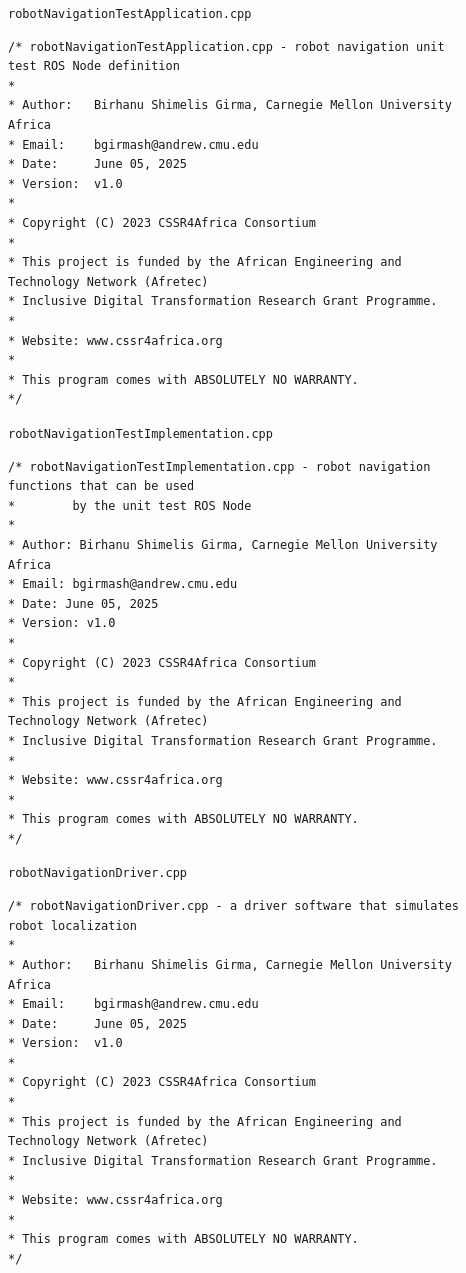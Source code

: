 \documentclass{CSSRforAfrica}
\newcommand{\checkboxChecked}{\fbox{\ding{51}}} %
\begin{document}
\begin{description}

\item[\checkboxChecked] {\small \verb+robotNavigationTestApplication.cpp+}
{\scriptsize \begin{verbatim}
/* robotNavigationTestApplication.cpp - robot navigation unit test ROS Node definition
*
* Author:   Birhanu Shimelis Girma, Carnegie Mellon University Africa
* Email:    bgirmash@andrew.cmu.edu
* Date:     June 05, 2025
* Version:  v1.0
*
* Copyright (C) 2023 CSSR4Africa Consortium
*
* This project is funded by the African Engineering and Technology Network (Afretec)
* Inclusive Digital Transformation Research Grant Programme.
*
* Website: www.cssr4africa.org
*
* This program comes with ABSOLUTELY NO WARRANTY.
*/
\end{verbatim} }

\item[\checkboxChecked] {\small \verb+robotNavigationTestImplementation.cpp+}
{\scriptsize \begin{verbatim}
/* robotNavigationTestImplementation.cpp - robot navigation functions that can be used
*        by the unit test ROS Node
*
* Author: Birhanu Shimelis Girma, Carnegie Mellon University Africa
* Email: bgirmash@andrew.cmu.edu
* Date: June 05, 2025
* Version: v1.0
*
* Copyright (C) 2023 CSSR4Africa Consortium
*
* This project is funded by the African Engineering and Technology Network (Afretec)
* Inclusive Digital Transformation Research Grant Programme.
*
* Website: www.cssr4africa.org
*
* This program comes with ABSOLUTELY NO WARRANTY.
*/
\end{verbatim} }

\item[\checkboxChecked] {\small \verb+robotNavigationDriver.cpp+}
{\scriptsize \begin{verbatim}
/* robotNavigationDriver.cpp - a driver software that simulates robot localization
*
* Author:   Birhanu Shimelis Girma, Carnegie Mellon University Africa
* Email:    bgirmash@andrew.cmu.edu
* Date:     June 05, 2025
* Version:  v1.0
*
* Copyright (C) 2023 CSSR4Africa Consortium
*
* This project is funded by the African Engineering and Technology Network (Afretec)
* Inclusive Digital Transformation Research Grant Programme.
*
* Website: www.cssr4africa.org
*
* This program comes with ABSOLUTELY NO WARRANTY.
*/
\end{verbatim} }

\end{description}
\end{document}
